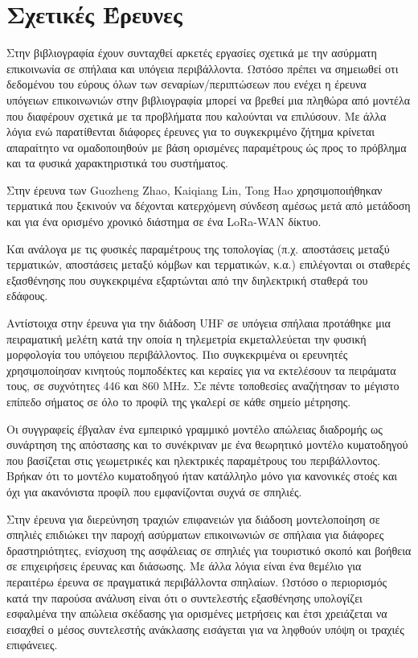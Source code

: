 \section{\textsf{Σχετικές Έρευνες}} 
    Στην βιβλιογραφία έχουν συνταχθεί
    αρκετές εργασίες σχετικά με την ασύρματη επικοινωνία σε σπήλαια και υπόγεια
    περιβάλλοντα. Ωστόσο πρέπει να σημειωθεί οτι δεδομένου του εύρους όλων των 
    σεναρίων/περιπτώσεων που ενέχει η έρευνα υπόγειων επικοινωνιών στην βιβλιογραφία
    μπορεί να βρεθεί μια πληθώρα από μοντέλα που διαφέρουν σχετικά με τα προβλήματα που
    καλούνται να επιλύσουν. Με άλλα λόγια ενώ παρατίθενται διάφορες έρευνες για το 
    συγκεκριμένο ζήτημα κρίνεται απαραίτητο να ομαδοποιηθούν με βάση ορισμένες παραμέτρους
    ώς προς το πρόβλημα και τα φυσικά χαρακτηριστικά του συστήματος.
    
    Στην έρευνα των Guozheng Zhao, Kaiqiang Lin, Tong Hao \cite{zhao_feasibility_2023}
    χρησιμοποιήθηκαν τερματικά που ξεκινούν να δέχονται κατερχόμενη σύνδεση αμέσως μετά 
    από μετάδοση και για ένα ορισμένο χρονικό διάστημα σε ένα LoRa-WAN δίκτυο.
    
    Και ανάλογα με τις φυσικές παραμέτρους της τοπολογίας (π.χ. αποστάσεις μεταξύ
    τερματικών, αποστάσεις μεταξύ κόμβων και τερματικών, κ.α.) επιλέγονται οι 
    σταθερές εξασθένησης που συγκεκριμένα εξαρτώνται από την διηλεκτρική 
    σταθερά του εδάφους.

    Αντίστοιχα στην έρευνα για την διάδοση UHF σε υπόγεια σπήλαια \cite{rak_uhf_2007}
    προτάθηκε μια πειραματική μελέτη κατά την οποία η τηλεμετρία εκμεταλλεύεται την φυσική
    μορφολογία του υπόγειου περιβάλλοντος. Πιο συγκεκριμένα οι ερευνητές χρησιμοποίησαν
    κινητούς πομποδέκτες και κεραίες για να εκτελέσουν τα πειράματα τους, σε συχνότητες 
    446 και 860 MHz. Σε πέντε τοποθεσίες αναζήτησαν το μέγιστο επίπεδο σήματος σε όλο το
    προφίλ της γκαλερί σε κάθε σημείο μέτρησης.

    Οι συγγραφείς έβγαλαν ένα εμπειρικό γραμμικό μοντέλο απώλειας διαδρομής ως συνάρτηση
    της απόστασης και το συνέκριναν με ένα θεωρητικό μοντέλο κυματοδηγού που βασίζεται στις
    γεωμετρικές και ηλεκτρικές παραμέτρους του περιβάλλοντος. Βρήκαν ότι το μοντέλο κυματοδηγού
    ήταν κατάλληλο μόνο για κανονικές στοές και όχι για ακανόνιστα προφίλ που εμφανίζονται
    συχνά σε σπηλιές.
    
    Στην έρευνα για διερεύνηση τραχιών επιφανειών για διάδοση μοντελοποίηση σε σπηλιές
    \cite{soo_investigation_2018} επιδιώκει την παροχή ασύρματων επικοινωνιών σε σπήλαια
    για διάφορες δραστηριότητες, ενίσχυση της ασφάλειας σε σπηλιές για τουριστικό σκοπό
    και βοήθεια σε επιχειρήσεις έρευνας και διάσωσης. Με άλλα λόγια είναι ένα θεμέλιο για
    περαιτέρω έρευνα σε πραγματικά περιβάλλοντα σπηλαίων. Ωστόσο ο περιορισμός κατά την
    παρούσα ανάλυση είναι ότι ο συντελεστής εξασθένησης υπολογίζει εσφαλμένα την απώλεια
    σκέδασης για ορισμένες μετρήσεις και έτσι χρειάζεται να εισαχθεί ο μέσος συντελεστής
    ανάκλασης εισάγεται για να ληφθούν υπόψη οι τραχιές επιφάνειες.

